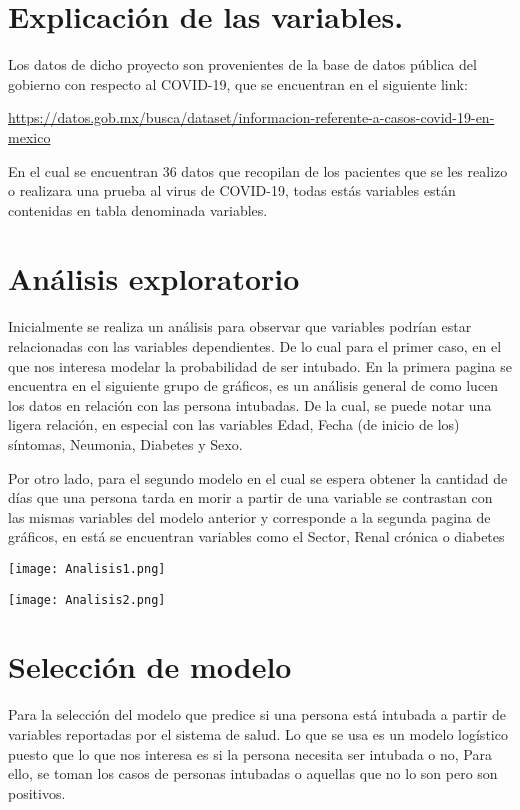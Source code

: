 \documentclass[12pt,a4paper,oneside]{article}
\begin{document}
\section{Explicación de las variables.}
Los datos de dicho proyecto son provenientes de la base de datos pública del gobierno con respecto al COVID-19, que se encuentran en el siguiente link:

\begin{footnotesize}
\url{https://datos.gob.mx/busca/dataset/informacion-referente-a-casos-covid-19-en-mexico}
\end{footnotesize}

En el cual se encuentran 36 datos que recopilan de los pacientes que se les realizo o realizara una prueba al virus de COVID-19, todas estás variables están contenidas en tabla denominada variables.


\section{Análisis exploratorio}
Inicialmente se realiza un análisis para observar que variables podrían estar relacionadas con las variables dependientes. De lo cual para el primer caso, en el que nos interesa modelar la probabilidad de ser intubado. En la primera pagina se encuentra en el siguiente grupo de gráficos, es un análisis general de como lucen los datos en relación con las persona intubadas. De la cual, se puede notar una ligera relación, en especial con las variables Edad, Fecha (de inicio de los) síntomas, Neumonia, Diabetes y Sexo.

Por otro lado, para el segundo modelo en el cual se espera obtener la cantidad de días que una persona tarda en morir a partir de una variable se contrastan con las mismas variables del modelo anterior y corresponde a la segunda pagina de gráficos, en está se encuentran variables como el Sector, Renal crónica o diabetes

\texttt{[image: Analisis1.png]}

\texttt{[image: Analisis2.png]}

\section{Selección de modelo}
Para la selección del modelo que predice si una persona está intubada a partir de variables reportadas por el sistema de salud. Lo que se usa es un modelo logístico puesto que lo que nos interesa es si la persona necesita ser intubada o no, Para ello, se toman los casos de personas intubadas o aquellas que no lo son pero son positivos.
\end{document}
